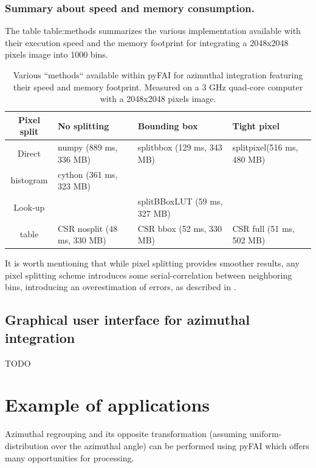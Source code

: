 \documentclass[preprint]{iucr}
\begin{document}
\subsubsection{Summary about speed and memory consumption.}

The table {table:methods}  summarizes the various implementation available  
with their execution speed and the memory footprint for integrating a 2048x2048
pixels image into 1000 bins.

\begin{table}
\caption{Various ``methods`` available within pyFAI for azimuthal integration
featuring their speed and memory footprint. Measured on a 3 GHz quad-core
computer with a 2048x2048 pixels image.}
\begin{tabular}[pos]{|c|l|l|l|}
\hline
Pixel split& No splitting & Bounding box & Tight pixel \\
\hline
Direct    & numpy (889 ms, 336 MB) & splitbbox (129 ms, 343 MB) &
splitpixel(516 ms, 480 MB)\\
histogram & cython (361 ms, 323 MB) &                       &                \\
\hline
Look-up   &       & splitBBoxLUT (59 ms, 327 MB) &    \\
table     & CSR nosplit (48 ms, 330 MB)       & CSR bbox (52 ms, 330
MB) & CSR full (51 ms, 502 MB)\\
\hline
\end{tabular}
\label{table:methods}
\end{table}

It is worth mentioning that while pixel splitting provides smoother results, any
pixel splitting scheme introduces some serial-correlation between
neighboring bins, introducing an overestimation of errors, as described in \cite{billinge2014}.

\subsection{Graphical user interface for azimuthal integration}

TODO

\section{Example of applications}

Azimuthal regrouping and its opposite transformation (assuming
uniform-distribution over the azimuthal angle) can be performed
using pyFAI which offers many opportunities for processing.
\end{document}
